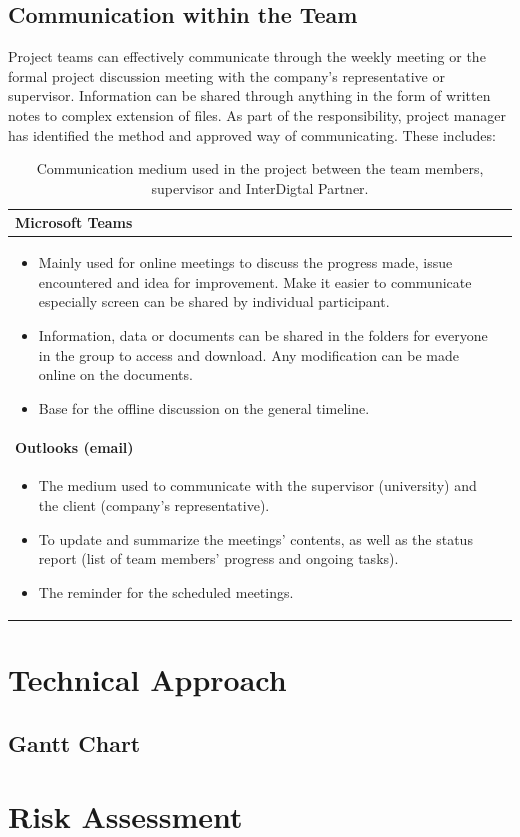 \subsection{Communication within the Team}
Project teams can effectively communicate through the weekly meeting or the formal project discussion meeting with the company’s representative or supervisor. Information can be shared through anything in the form of written notes to complex extension of files. As part of the responsibility, project manager has identified the method and approved way of communicating. These includes:
\begin{table}[]
    \centering
    \begin{tabular}{p{14cm}l}
      \hline
      \textbf{Microsoft Teams}  \\
      \hline 
         \begin{itemize}
             \item Mainly used for online meetings to discuss the progress made, issue encountered and idea for improvement. Make it easier to communicate especially screen can be shared by individual participant.
             \item Information, data or documents can be shared in the folders for everyone in the group to access and download. Any modification can be made online on the documents.
             \item Base for the offline discussion on the general timeline.
         \end{itemize} \\
         \hline
      \textbf{Outlooks (email)}  \\
            \hline 
         \begin{itemize}
             \item The medium used to communicate with the supervisor (university) and the client (company’s representative).
             \item To update and summarize the meetings’ contents, as well as the status report (list of team members’ progress and ongoing tasks).
             \item The reminder for the scheduled meetings.
         \end{itemize} \\
         \hline
    \end{tabular}
    \caption{Communication medium used in the project between the team members, supervisor and InterDigtal Partner.}
    \label{tab:communication}
\end{table}

\section{Technical Approach}
\subsection{Gantt Chart}

\section{Risk Assessment}
